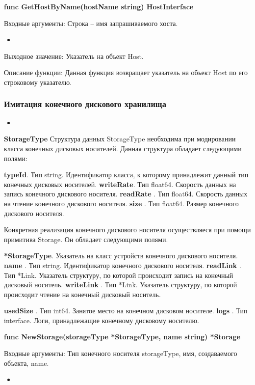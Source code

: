 \textbf{func GetHostByName(hostName string) HostInterface }

Входные аргументы: Строка -- имя запрашиваемого хоста. 
\begin{itemize}
	\item 
\end{itemize}
Выходное значение: Указатель на объект Host.

Описание функции: Данная функция возвращает указатель на объект Host по его строковому указателю.

\subsubsection{Имитация конечного дискового хранилища}
\begin{itemize}
	\item 
\end{itemize}
\textbf{StorageType}
Структура данных StorageType необходима при модировании класса конечных дисковых носителей. Данная структура обладает следующими полями:

\textbf{	typeId}. Тип    string. Идентификатор класса, к которому принадлежит данный тип конечных дисковых носителей. 
\textbf{	writeRate}. Тип float64. Скорость данных на запись конечного дискового носителя.
\textbf{	readRate }. Тип float64. Скорость данных на чтение конечного дискового носителя.
\textbf{	size     }. Тип float64. Размер конечного дискового носителя.

Конкретная реализация конечного дискового носителя осуществляеся при помощи примитива Storage. Он обладает следующими полями. 

\textbf{	*StorageType}. Указатель на класс устройств конечного дискового носителя. 
\textbf{	name     }. Тип string. Идентификатор конечного дискового носителя.
\textbf{	readLink }. Тип *Link. Указатель структуру, по которой происходит запись на  конечный дисковый носитель.
\textbf{	writeLink }. Тип *Link. Указатель структуру, по которой происходит чтение на  конечный дисковый носитель.

\textbf{	usedSize }. Тип int64. Занятое место на конечном дисковом носителе.
\textbf{	logs }. Тип interface{}. Логи, принадлежащие конечному дисковому носителю.


\textbf{func NewStorage(storageType *StorageType, name string) *Storage}

Входные аргументы: Тип конечного носителя storageType, имя, создаваемого объекта, name.
\begin{itemize}
	\item 
\end{itemize} 


